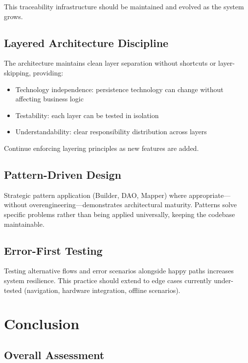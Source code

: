 \documentclass[11pt,a4paper]{article}
\begin{document}
This traceability infrastructure should be maintained and evolved as the system grows.

\subsection{Layered Architecture Discipline}

The architecture maintains clean layer separation without shortcuts or layer-skipping, providing:
\begin{itemize}
    \item Technology independence: persistence technology can change without affecting business logic
    \item Testability: each layer can be tested in isolation
    \item Understandability: clear responsibility distribution across layers
\end{itemize}

Continue enforcing layering principles as new features are added.

\subsection{Pattern-Driven Design}

Strategic pattern application (Builder, DAO, Mapper) where appropriate—without overengineering—demonstrates architectural maturity. Patterns solve specific problems rather than being applied universally, keeping the codebase maintainable.

\subsection{Error-First Testing}

Testing alternative flows and error scenarios alongside happy paths increases system resilience. This practice should extend to edge cases currently under-tested (navigation, hardware integration, offline scenarios).

\section{Conclusion}

\subsection{Overall Assessment}
\end{document}
